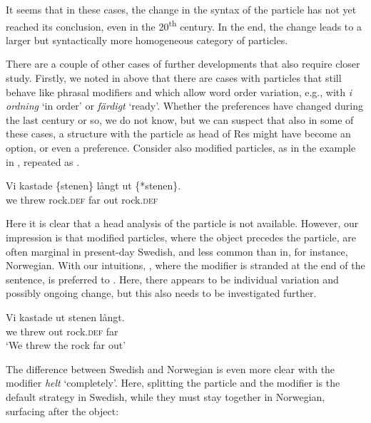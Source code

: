 \documentclass[output=paper]{langscibook}
\begin{document}
It seems that in these cases, the change in the syntax of the particle has not yet reached its conclusion, even in the 20\textsuperscript{th} century. In the end, the change leads to a larger but syntactically more homogeneous category of particles. 



There are a couple of other cases of further developments that also require closer study. Firstly, we noted in  above that there are cases with particles that still behave like phrasal modifiers and which allow word order variation, e.g., with \textit{i ordning} ‘in order’ or \textit{färdigt} ‘ready’. Whether the preferences have changed during the last century or so, we do not know, but we can suspect that also in some of these cases, a structure with the particle as head of Res might have become an option, or even a preference. Consider also modified particles, as in the example in , repeated as .


\ea\label{ex:lalu:66}
\gll Vi     kastade \{stenen\}       långt    ut   \{*stenen\}.\\
we   threw     rock.\textsc{def}     far     out   rock.\textsc{def}\\
\z


Here it is clear that a head analysis of the particle is not available. However, our impression is that modified particles, where the object precedes the particle, are often marginal in present-day Swedish, and less common than in, for instance, Norwegian. With our intuitions, , where the modifier is stranded at the end of the sentence, is preferred to . Here, there appears to be individual variation and possibly ongoing change, but this also needs to be investigated further.


\ea\label{ex:lalu:67}
\gll  Vi     kastade   ut     stenen       långt.\\
we   threw     out     rock\textsc{.def}   far \\
\glt `We threw the rock far out'
\z


The difference between Swedish and Norwegian is even more clear with the modifier \textit{helt} ‘completely’. Here, splitting the particle and the modifier is the default strategy in Swedish, while they must stay together in Norwegian, surfacing after the object:
\end{document}
